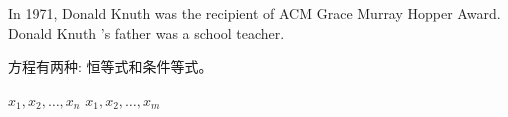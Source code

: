 \documentclass[11pt,a4paper,openany]{article}
\newcommand{\mycmdA}{Donald Knuth }
\newcommand{\mycmdC}[1]{{\heiti #1}}
\newcommand{\mycmdD}[2]{$#1_1,#1_2,\dots,#1_#2$}
\begin{document}
In 1971, \mycmdA was the recipient of ACM Grace Murray Hopper Award.
\mycmdA's father was a school teacher. \newline

方程有两种: \mycmdC{恒等式}和\mycmdC{条件等式}。\newline

\mycmdD{x}{n}\newline
\mycmdD{x}{m}\newline
\end{document}

